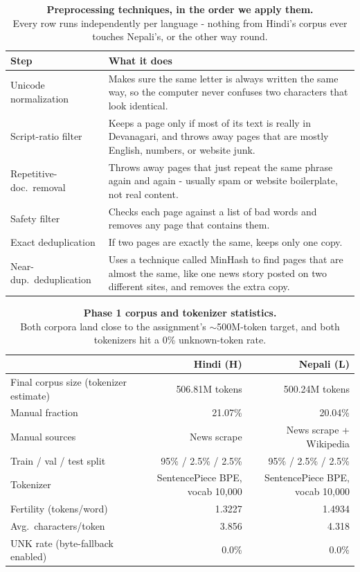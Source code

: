 \documentclass[11pt]{article}
\newcommand{\figcap}[2]{\textbf{#1}\\[2pt]#2}
\begin{document}
\begin{table}[H]
\centering \small
\begin{tabular}{lp{11.3cm}}
\toprule
Step & What it does \\
\midrule
Unicode normalization & Makes sure the same letter is always written the same way, so the computer never confuses two characters that look identical. \\
Script-ratio filter & Keeps a page only if most of its text is really in Devanagari, and throws away pages that are mostly English, numbers, or website junk. \\
Repetitive-doc.\ removal & Throws away pages that just repeat the same phrase again and again - usually spam or website boilerplate, not real content. \\
Safety filter & Checks each page against a list of bad words and removes any page that contains them. \\
Exact deduplication & If two pages are exactly the same, keeps only one copy. \\
Near-dup.\ deduplication & Uses a technique called MinHash to find pages that are almost the same, like one news story posted on two different sites, and removes the extra copy. \\
\bottomrule
\end{tabular}
\caption{\figcap{Preprocessing techniques, in the order we apply them.}{Every row runs independently per language - nothing from Hindi's corpus ever touches Nepali's, or the other way round.}}
\end{table}

\begin{table}[h]
\centering \small
\begin{tabular}{lrr}
\toprule
 & Hindi (H) & Nepali (L) \\
\midrule
Final corpus size (tokenizer estimate) & 506.81M tokens & 500.24M tokens \\
Manual fraction & 21.07\% & 20.04\% \\
Manual sources & News scrape & News scrape + Wikipedia \\
Train / val / test split & 95\% / 2.5\% / 2.5\% & 95\% / 2.5\% / 2.5\% \\
Tokenizer & SentencePiece BPE, vocab 10,000 & SentencePiece BPE, vocab 10,000 \\
Fertility (tokens/word) & 1.3227 & 1.4934 \\
Avg.\ characters/token & 3.856 & 4.318 \\
UNK rate (byte-fallback enabled) & 0.0\% & 0.0\% \\
\bottomrule
\end{tabular}
\caption{\figcap{Phase 1 corpus and tokenizer statistics.}{Both corpora land close to the assignment's $\sim$500M-token target, and both tokenizers hit a 0\% unknown-token rate.}}
\end{table}
\end{document}
